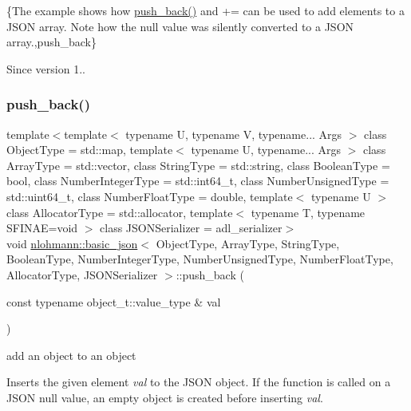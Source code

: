 \{The example shows how {\ttfamily \mbox{\hyperlink{classnlohmann_1_1basic__json_ac8e523ddc8c2dd7e5d2daf0d49a9c0d7}{push\+\_\+back()}}} and {\ttfamily +=} can be used to add elements to a J\+S\+ON array. Note how the {\ttfamily null} value was silently converted to a J\+S\+ON array.,push\+\_\+back\}

\begin{DoxySince}{Since}
version 1.. 
\end{DoxySince}
\mbox{\label{classnlohmann_1_1basic__json_ae11a3a51782c058fff2f6550cdfb9b3c}} 
\subsubsection{\texorpdfstring{push\+\_\+back()}{push\_back()}\hspace{0.1cm}{\footnotesize\ttfamily [3/4]}}
{\footnotesize\ttfamily template$<$template$<$ typename U, typename V, typename... Args $>$ class Object\+Type = std\+::map, template$<$ typename U, typename... Args $>$ class Array\+Type = std\+::vector, class String\+Type  = std\+::string, class Boolean\+Type  = bool, class Number\+Integer\+Type  = std\+::int64\+\_\+t, class Number\+Unsigned\+Type  = std\+::uint64\+\_\+t, class Number\+Float\+Type  = double, template$<$ typename U $>$ class Allocator\+Type = std\+::allocator, template$<$ typename T, typename S\+F\+I\+N\+A\+E=void $>$ class J\+S\+O\+N\+Serializer = adl\+\_\+serializer$>$ \\
void \mbox{\hyperlink{classnlohmann_1_1basic__json}{nlohmann\+::basic\+\_\+json}}$<$ Object\+Type, Array\+Type, String\+Type, Boolean\+Type, Number\+Integer\+Type, Number\+Unsigned\+Type, Number\+Float\+Type, Allocator\+Type, J\+S\+O\+N\+Serializer $>$\+::push\+\_\+back (\begin{DoxyParamCaption}\item[{const typename object\+\_\+t\+::value\+\_\+type \&}]{val }\end{DoxyParamCaption})\hspace{0.3cm}{\ttfamily [inline]}}



add an object to an object 

Inserts the given element {\itshape val} to the J\+S\+ON object. If the function is called on a J\+S\+ON null value, an empty object is created before inserting {\itshape val}.



